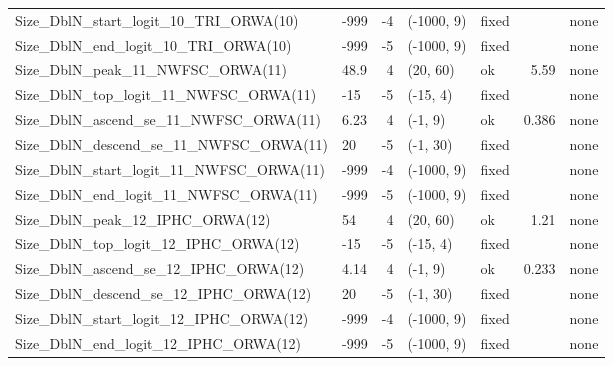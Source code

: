 \documentclass[
]{scrartcl}
\begin{document}
\begin{landscape}
\begin{longtable}{llrllrl}
Size\_DblN\_start\_logit\_10\_TRI\_ORWA(10) & -999 & -4 & (-1000, 9) & fixed &  & none \\ 
Size\_DblN\_end\_logit\_10\_TRI\_ORWA(10) & -999 & -5 & (-1000, 9) & fixed &  & none \\ 
Size\_DblN\_peak\_11\_NWFSC\_ORWA(11) & 48.9 & 4 & (20, 60) & ok & 5.59 & none \\ 
Size\_DblN\_top\_logit\_11\_NWFSC\_ORWA(11) & -15 & -5 & (-15, 4) & fixed &  & none \\ 
Size\_DblN\_ascend\_se\_11\_NWFSC\_ORWA(11) & 6.23 & 4 & (-1, 9) & ok & 0.386 & none \\ 
Size\_DblN\_descend\_se\_11\_NWFSC\_ORWA(11) & 20 & -5 & (-1, 30) & fixed &  & none \\ 
Size\_DblN\_start\_logit\_11\_NWFSC\_ORWA(11) & -999 & -4 & (-1000, 9) & fixed &  & none \\ 
Size\_DblN\_end\_logit\_11\_NWFSC\_ORWA(11) & -999 & -5 & (-1000, 9) & fixed &  & none \\ 
Size\_DblN\_peak\_12\_IPHC\_ORWA(12) & 54 & 4 & (20, 60) & ok & 1.21 & none \\ 
Size\_DblN\_top\_logit\_12\_IPHC\_ORWA(12) & -15 & -5 & (-15, 4) & fixed &  & none \\ 
Size\_DblN\_ascend\_se\_12\_IPHC\_ORWA(12) & 4.14 & 4 & (-1, 9) & ok & 0.233 & none \\ 
Size\_DblN\_descend\_se\_12\_IPHC\_ORWA(12) & 20 & -5 & (-1, 30) & fixed &  & none \\ 
Size\_DblN\_start\_logit\_12\_IPHC\_ORWA(12) & -999 & -4 & (-1000, 9) & fixed &  & none \\ 
Size\_DblN\_end\_logit\_12\_IPHC\_ORWA(12) & -999 & -5 & (-1000, 9) & fixed &  & none \\ 
\bottomrule

\end{longtable}

\endgroup

\end{landscape}

\newpage{}
\end{document}
